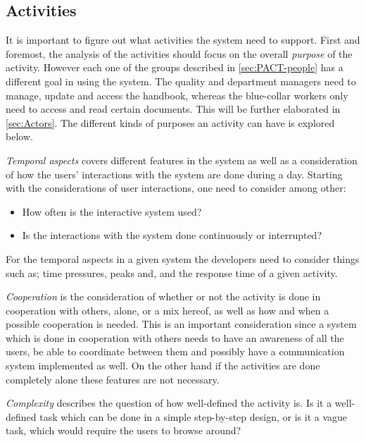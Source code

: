 \subsection{Activities}\label{sec:PACT-actvities}

It is important to figure out what activities the system need to support.
First and foremost, the analysis of the activities should focus on the overall \textit{purpose} of the activity.
However each one of the groups described in \cref{sec:PACT-people} has a different goal in using the system.
The quality and department managers need to manage, update and access the handbook, whereas the blue-collar workers only need to access and read certain documents.
This will be further elaborated in \cref{sec:Actors}.
The different kinds of purposes an activity can have is explored below.

\textit{Temporal aspects} covers different features in the system as well as a consideration of how the users' interactions with the system are done during a day.
Starting with the considerations of user interactions, one need to consider among other:

\begin{itemize}
	\item How often is the interactive system used?
	\item Is the interactions with the system done continuously or interrupted?
\end{itemize}

For the temporal aspects in a given system the developers need to consider things such as; time pressures, peaks and, and the response time of a given activity.

\textit{Cooperation} is the consideration of whether or not the activity is done in cooperation with others, alone, or a mix hereof, as well as how and when a possible cooperation is needed.
This is an important consideration since a system which is done in cooperation with others needs to have an awareness of all the users, be able to coordinate between them and possibly have a communication system implemented as well.
On the other hand if the activities are done completely alone these features are not necessary.

\textit{Complexity} describes the question of how well-defined the activity is.
Is it a well-defined task which can be done in a simple step-by-step design, or is it a vague task, which would require the users to browse around?


